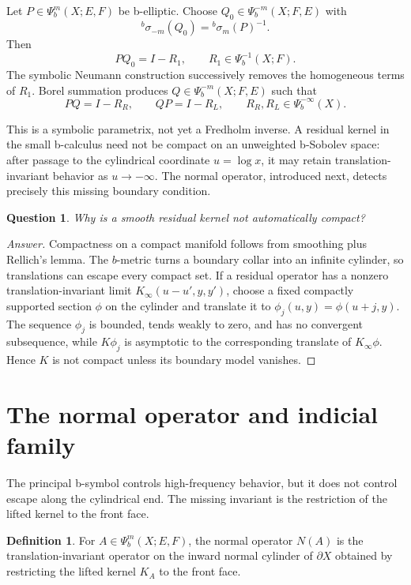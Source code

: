\documentclass[12pt,oneside,reqno]{article}
\theoremstyle{plain}
\newtheorem{question}[theorem]{Question}
\theoremstyle{definition}
\newtheorem{definition}[theorem]{Definition}
\theoremstyle{remark}
\newenvironment{answer}{\begin{proof}[Answer]}{\end{proof}}
\begin{document}
Let \(P\in\Psi_b^m(X;E,F)\) be b-elliptic. Choose
\(Q_0\in\Psi_b^{-m}(X;F,E)\) with
\[
 {}^b\sigma_{-m}(Q_0)={}^b\sigma_m(P)^{-1}.
\]
Then
\[
 P Q_0=I-R_1,\qquad R_1\in\Psi_b^{-1}(X;F).
\]
The symbolic Neumann construction successively removes the homogeneous
terms of \(R_1\). Borel summation produces
\(Q\in\Psi_b^{-m}(X;F,E)\) such that
\[
 P Q=I-R_R,\qquad QP=I-R_L,
 \qquad R_R,R_L\in\Psi_b^{-\infty}(X).
\]

This is a symbolic parametrix, not yet a Fredholm inverse. A residual kernel
in the small b-calculus need not be compact on an unweighted b-Sobolev
space: after passage to the cylindrical coordinate \(u=\log x\), it may
retain translation-invariant behavior as \(u\to-\infty\). The normal operator,
introduced next, detects precisely this missing boundary condition.

\begin{question}
Why is a smooth residual kernel not automatically compact?
\end{question}

\begin{answer}
Compactness on a compact manifold follows from smoothing plus Rellich's
lemma. The \(b\)-metric turns a boundary collar into an infinite cylinder,
so translations can escape every compact set. If a residual operator has a
nonzero translation-invariant limit \(K_\infty(u-u',y,y')\), choose a fixed
compactly supported section \(\phi\) on the cylinder and translate it to
\(\phi_j(u,y)=\phi(u+j,y)\). The sequence \(\phi_j\) is bounded, tends weakly
to zero, and has no convergent subsequence, while \(K\phi_j\) is
asymptotic to the corresponding translate of \(K_\infty\phi\). Hence
\(K\) is not compact unless its boundary model vanishes.
\end{answer}


\section{The normal operator and indicial family}
\label{sec:normal-op}

The principal b-symbol controls high-frequency behavior, but it does not
control escape along the cylindrical end. The missing invariant is the
restriction of the lifted kernel to the front face.

\begin{definition}
For \(A\in\Psi_b^m(X;E,F)\), the normal operator \(N(A)\) is the
translation-invariant operator on the inward normal cylinder of
\(\partial X\) obtained by restricting the lifted kernel \(K_A\) to the
front face.
\end{definition}
\end{document}
